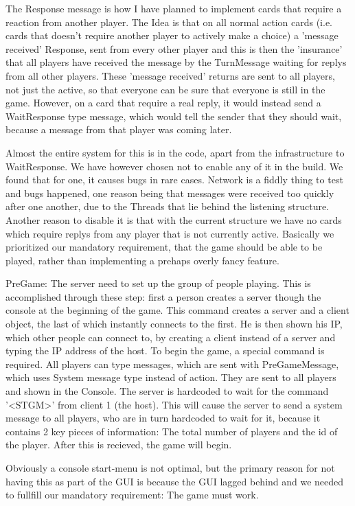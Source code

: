 The Response message is how I have planned to implement cards that require a reaction from another player.
The Idea is that on all normal action cards (i.e. cards that doesn't require another player to actively make a choice) a 'message received' Response, sent from every other player and this is then the 'insurance' that all players have received the message by the TurnMessage waiting for replys from all other players. 
These 'message received' returns are sent to all players, not just the active, so that everyone can be sure that everyone is still in the game.
However, on a card that require a real reply, it would instead send a WaitResponse type message, which would tell the sender that they should wait, because a message from that player was coming later.

Almost the entire system for this is in the code, apart from the infrastructure to WaitResponse. 
We have however chosen not to enable any of it in the build. We found that for one, it causes bugs in rare cases.
Network is a fiddly thing to test and bugs happened, one reason being that messages were received too quickly after one another, due to the Threads that lie behind the listening structure. Another reason to disable it is that with the current structure we have no cards which require replys from any player that is not currently active.
Basically we prioritized our mandatory requirement, that the game should be able to be played, rather than implementing a prehaps overly fancy feature.

PreGame:
The server need to set up the group of people playing. 
This is accomplished through these step: first a person creates a server though the console at the beginning of the game. 
This command creates a server and a client object, the last of which instantly connects to the first. 
He is then shown his IP, which other people can connect to, by creating a client instead of a server and typing the IP address of the host.
To begin the game, a special command is required. All players can type messages, which are sent with PreGameMessage, which uses System message type instead of action. 
They are sent to all players and shown in the Console. The server is hardcoded to wait for the command '<STGM>' from client 1 (the host). 
This will cause the server to send a system message to all players, who are in turn hardcoded to wait for it, because it contains 2 key pieces of information: The total number of players and the id of the player. 
After this is recieved, the game will begin.

Obviously a console start-menu is not optimal, but the primary reason for not having this as part of the GUI is because the GUI lagged behind and we needed to fullfill our mandatory requirement: The game must work.

